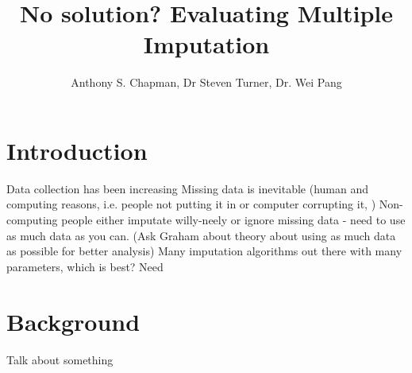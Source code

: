 \documentclass{IEEEconf}
\title{No solution? Evaluating Multiple Imputation}
\author{Anthony S. Chapman, Dr Steven Turner, Dr. Wei Pang}
\begin{document}
 
	\maketitle{} 





	\section{Introduction} %
	\label{sec:introduction}
		Data collection has been increasing 
		Missing data is inevitable (human and computing reasons, i.e. people not putting it in or computer corrupting it, )
		Non-computing people either imputate willy-neely or ignore missing data - need to use as much data as you can. (Ask Graham about theory about using as much data as possible for better analysis)
		Many imputation algorithms out there with many parameters, which is best? 
		Need 

	\section{Background} %
	\label{sec:background}
		Talk about something \cite{epi1}
		\cite{bigData}
\end{document}
